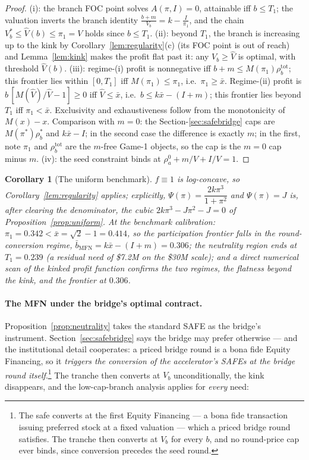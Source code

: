 \documentclass[11pt]{article}
\newtheorem{corollary}{Corollary}
\theoremstyle{definition}
\begin{document}
\begin{proof}
(i): the branch FOC point solves $A(\pi,I)=0$, attainable iff $b\le T_1$; the valuation inverts the branch identity $\tfrac{b+m}{V_b}=k-\tfrac{I}{\pi_1}$, and the chain $V_b^{*}\le\hat V(b)\le\pi_1=V$ holds since $b\le T_1$. (ii): beyond $T_1$, the branch is increasing up to the kink by Corollary~\ref{lem:regularity}(c) (its FOC point is out of reach) and Lemma~\ref{lem:kink} makes the profit flat past it: any $V_b\ge\hat V$ is optimal, with threshold $\hat V(b)$. (iii): regime-(i) profit is nonnegative iff $b+m\le M(\pi_1)\rho_b^{\mathrm{tot}}$; this frontier lies within $[0,T_1]$ iff $M(\pi_1)\le\pi_1$, i.e.\ $\pi_1\ge\bar x$. Regime-(ii) profit is $b\,[M(\hat V)/\hat V-1]\ge0$ iff $\hat V\le\bar x$, i.e.\ $b\le k\bar x-(I+m)$; this frontier lies beyond $T_1$ iff $\pi_1<\bar x$. Exclusivity and exhaustiveness follow from the monotonicity of $M(x)-x$. Comparison with $m=0$: the Section-\ref{sec:safebridge} caps are $M(\pi^{*})\rho_b^{*}$ and $k\bar x-I$; in the second case the difference is exactly $m$; in the first, note $\pi_1$ and $\rho_b^{\mathrm{tot}}$ are the $m$-free Game-1 objects, so the cap is the $m=0$ cap minus $m$. (iv): the seed constraint binds at $\rho_a^{0}+m/V+I/V=1$.
\end{proof}

\begin{corollary}[The uniform benchmark]\label{cor:uniformOK}
$f\equiv1$ is log-concave, so Corollary~\ref{lem:regularity} applies; explicitly, $\Psi(\pi)=\dfrac{2k\pi^{3}}{1+\pi^{2}}$ and $\Psi(\pi)=J$ is, after clearing the denominator, the cubic $2k\pi^{3}-J\pi^{2}-J=0$ of Proposition~\ref{prop:uniform}. At the benchmark calibration: $\pi_1=0.342<\bar x=\sqrt2-1=0.414$, so the participation frontier falls in the round-conversion regime, $\bar b_{\mathrm{MFN}}=k\bar x-(I+m)=0.306$; the neutrality region ends at $T_1=0.239$ (a residual need of \$7.2M on the \$30M scale); and a direct numerical scan of the kinked profit function confirms the two regimes, the flatness beyond the kink, and the frontier at $0.306$.
\end{corollary}

\paragraph{The MFN under the bridge's optimal contract.} Proposition~\ref{prop:neutrality} takes the standard SAFE as the bridge's instrument. Section~\ref{sec:safebridge} says the bridge may prefer otherwise --- and the institutional detail cooperates: a priced bridge round is a bona fide Equity Financing, so it \emph{triggers the conversion of the accelerator's SAFEs at the bridge round itself}.\footnote{The safe converts at the first Equity Financing --- a bona fide transaction issuing preferred stock at a fixed valuation --- which a priced bridge round satisfies. The tranche then converts at $V_b$ for every $b$, and no round-price cap ever binds, since conversion precedes the seed round.} The tranche then converts at $V_b$ unconditionally, the kink disappears, and the low-cap-branch analysis applies for \emph{every} need:
\end{document}
